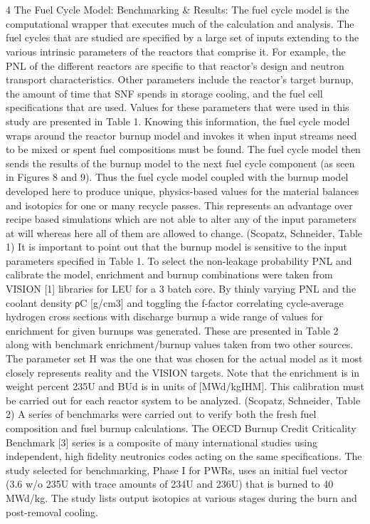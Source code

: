 \section{}
\label{1g_sec:}
4 The Fuel Cycle Model: Benchmarking & Results:
The fuel cycle model is the computational wrapper that executes much of the calculation and analysis.  The fuel cycles that are studied are specified by a large set of inputs extending to the various intrinsic parameters of the reactors that comprise it.  For example, the PNL of the different reactors are specific to that reactor’s design and neutron transport characteristics.  Other parameters include the reactor’s target burnup, the amount of time that SNF spends in storage cooling, and the fuel cell specifications that are used.  Values for these parameters that were used in this study are presented in Table 1.  Knowing this information, the fuel cycle model wraps around the reactor burnup model and invokes it when input streams need to be mixed or spent fuel compositions must be found.  The fuel cycle model then sends the results of the burnup model to the next fuel cycle component (as seen in Figures 8 and 9).  Thus the fuel cycle model coupled with the burnup model developed here to produce unique, physics-based values for the material balances and isotopics for one or many recycle passes.  This represents an advantage over recipe based simulations which are not able to alter any of the input parameters at will whereas here all of them are allowed to change. 
(Scopatz, Schneider, Table 1)
It is important to point out that the burnup model is sensitive to the input parameters specified in Table 1.  To select the non-leakage probability PNL and calibrate the model, enrichment and burnup combinations were taken from VISION [1] libraries for LEU for a 3 batch core.  By thinly varying PNL and the coolant density ρC [g/cm3] and toggling the f-factor correlating cycle-average hydrogen cross sections with discharge burnup a wide range of values for enrichment for given burnups was generated.  These are presented in Table 2 along with benchmark enrichment/burnup values taken from two other sources.  The parameter set H was the one that was chosen for the actual model as it most closely represents reality and the VISION targets.  Note that the enrichment is in weight percent 235U and BUd is in units of [MWd/kgIHM].  This calibration must be carried out for each reactor system to be analyzed.
(Scopatz, Schneider, Table 2)
A series of benchmarks were carried out to verify both the fresh fuel composition and fuel burnup calculations.  The OECD Burnup Credit Criticality Benchmark [3] series is a composite of many international studies using independent, high fidelity neutronics codes acting on the same specifications.  The study selected for benchmarking, Phase I for PWRs, uses an initial fuel vector (3.6 w/o 235U with trace amounts of 234U and 236U) that is burned to 40 MWd/kg.  The study lists output isotopics at various stages during the burn and post-removal cooling.  
